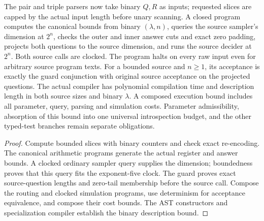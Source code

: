 \begin{lemma}
\label{lem:intro-dynamic-source-compiler}
\leanok
The pair and triple parsers now take binary $Q,R$ as inputs; requested slices
are capped by the actual input length before unary scanning. A closed program
computes the canonical bounds from binary $(\lambda,n)$, queries the source
sampler's dimension at $2^n$, checks the outer and inner answer cuts and exact
zero padding, projects both questions to the source dimension, and runs the
source decider at $2^n$. Both source calls are clocked. The program halts on
every raw input even for arbitrary source program texts. For a bounded source
and $n\geq1$, its acceptance is exactly the guard conjunction with original
source acceptance on the projected questions. The actual compiler has
polynomial compilation time and description length in both source sizes and
binary $\lambda$. A composed execution bound includes all parameter, query,
parsing and simulation costs. Parameter admissibility, absorption of this
bound into one universal introspection budget, and the other typed-test
branches remain separate obligations.
\end{lemma}
\begin{proof}
\leanok
Compute bounded slices with binary counters and check exact re-encoding.
The canonical arithmetic programs generate the actual register and answer
bounds. A clocked ordinary sampler query supplies the dimension; boundedness
proves that this query fits the exponent-five clock. The guard proves exact
source-question lengths and zero-tail membership before the source call.
Compose the routing and clocked simulation programs, use determinism for
acceptance equivalence, and compose their cost bounds. The AST constructors
and specialization compiler establish the binary description bound.
\end{proof}

